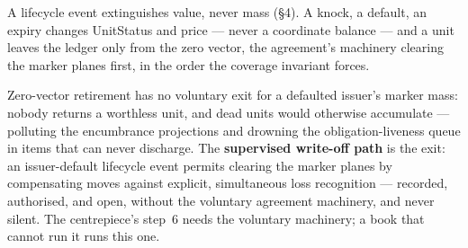A lifecycle event extinguishes value, never mass (\S4). A knock, a default, an
expiry changes UnitStatus and price --- never a coordinate balance --- and a
unit leaves the ledger only from the zero vector, the agreement's machinery
clearing the marker planes first, in the order the coverage invariant forces.

Zero-vector retirement has no voluntary exit for a defaulted issuer's marker
mass: nobody returns a worthless unit, and dead units would otherwise
accumulate --- polluting the encumbrance projections and drowning the
obligation-liveness queue in items that can never discharge. The
\textbf{supervised write-off path} is the exit: an issuer-default lifecycle
event permits clearing the marker planes by compensating moves against
explicit, simultaneous loss recognition --- recorded, authorised, and open,
without the voluntary agreement machinery, and never silent. The centrepiece's
step~6 needs the voluntary machinery; a book that cannot run it runs this one.
